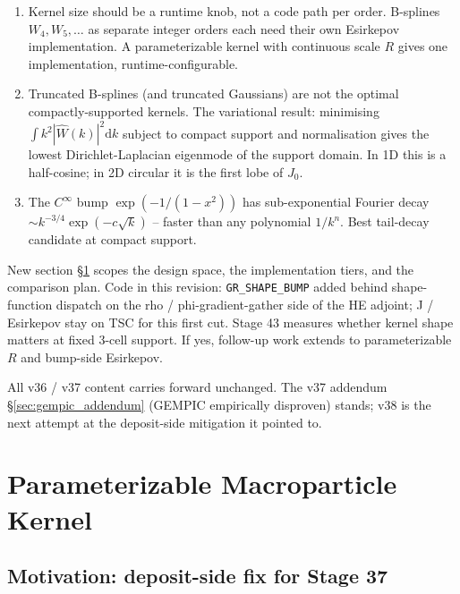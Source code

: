 \documentclass[11pt,a4paper]{article}
\newcommand{\dd}{\mathrm{d}}
\begin{document}
\begin{enumerate}
  \item Kernel size should be a runtime knob, not a code path per
    order.  B-splines $W_4, W_5, \ldots$ as separate integer orders
    each need their own Esirkepov implementation.  A parameterizable
    kernel with continuous scale $R$ gives one implementation,
    runtime-configurable.
  \item Truncated B-splines (and truncated Gaussians) are not the
    optimal compactly-supported kernels.  The variational result:
    minimising $\int k^2 |\hat W(k)|^2 \dd k$ subject to compact
    support and normalisation gives the lowest Dirichlet-Laplacian
    eigenmode of the support domain.  In 1D this is a half-cosine;
    in 2D circular it is the first lobe of $J_0$.
  \item The $C^\infty$ bump $\exp(-1/(1-x^2))$ has sub-exponential
    Fourier decay $\sim k^{-3/4}\exp(-c\sqrt{k})$ -- faster than
    any polynomial $1/k^n$.  Best tail-decay candidate at compact
    support.
\end{enumerate}

New section §\ref{sec:kernel_design} scopes the design space, the
implementation tiers, and the comparison plan.  Code in this
revision: \texttt{GR\_SHAPE\_BUMP} added behind shape-function
dispatch on the rho / phi-gradient-gather side of the HE adjoint;
J / Esirkepov stay on TSC for this first cut.  Stage 43 measures
whether kernel shape matters at fixed 3-cell support.  If yes,
follow-up work extends to parameterizable $R$ and bump-side
Esirkepov.

All v36 / v37 content carries forward unchanged.  The v37 addendum
§\ref{sec:gempic_addendum} (GEMPIC empirically disproven) stands;
v38 is the next attempt at the deposit-side mitigation it pointed to.

\newpage

\section{Parameterizable Macroparticle Kernel}
\label{sec:kernel_design}

\subsection{Motivation: deposit-side fix for Stage 37}
\end{document}
